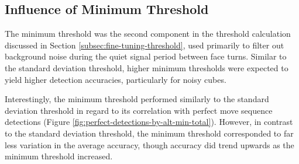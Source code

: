 







\subsection{Influence of Minimum Threshold}
\label{subsec:influence-alt-min}

The minimum threshold was the second component in the threshold
calculation discussed in Section \ref{subsec:fine-tuning-threshold},
used primarily to filter out background noise during the quiet signal
period between face turns. Similar to the standard deviation threshold,
higher minimum thresholds were expected to yield higher detection
accuracies, particularly for noisy cubes.

Interestingly, the minimum threshold performed similarly to the
standard deviation threshold in regard to its correlation with perfect
move sequence detections (Figure
\ref{fig:perfect-detections-by-alt-min-total}). However, in contrast to
the standard deviation threshold, the minimum threshold corresponded to
far less variation in the average accuracy, though accuracy did trend
upwards as the minimum threshold increased.

